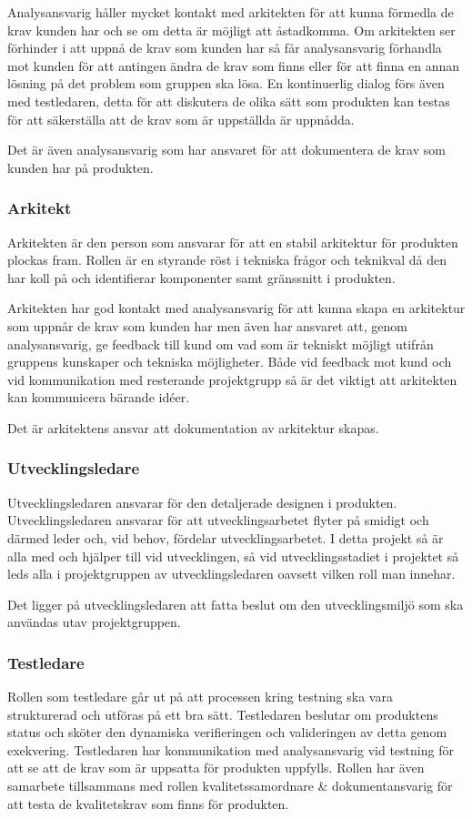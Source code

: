 \documentclass[a4paper,10pt]{article}
\begin{document}
Analysansvarig håller mycket kontakt med arkitekten för att kunna förmedla de krav kunden har och se om detta är möjligt att åstadkomma. Om arkitekten ser förhinder i att uppnå de krav som kunden har så får analysansvarig förhandla mot kunden för att antingen ändra de krav som finns eller för att finna en annan lösning på det problem som gruppen ska lösa.
En kontinuerlig dialog förs även med testledaren, detta för att diskutera de olika sätt som produkten kan testas för att säkerställa att de krav som är uppställda är uppnådda.

Det är även analysansvarig som har ansvaret för att dokumentera de krav som kunden har på produkten.
\subsubsection{Arkitekt}
Arkitekten är den person som ansvarar för att en stabil arkitektur för produkten plockas fram. Rollen är en styrande röst i tekniska frågor och teknikval då den har koll på och identifierar komponenter samt gränssnitt i produkten.

Arkitekten har god kontakt med analysansvarig för att kunna skapa en arkitektur som uppnår de krav som kunden har men även har ansvaret att, genom analysansvarig, ge feedback till kund om vad som är tekniskt möjligt utifrån gruppens kunskaper och tekniska möjligheter. Både vid feedback mot kund och vid kommunikation med resterande projektgrupp så är det viktigt att arkitekten kan kommunicera bärande idéer.

Det är arkitektens ansvar att dokumentation av arkitektur skapas.
\subsubsection{Utvecklingsledare}
Utvecklingsledaren ansvarar för den detaljerade designen i produkten. Utvecklingsledaren ansvarar för att utvecklingsarbetet flyter på smidigt och därmed leder och, vid behov, fördelar utvecklingsarbetet. I detta projekt så är alla med och hjälper till vid utvecklingen, så vid utvecklingsstadiet i projektet så leds alla i projektgruppen av utvecklingsledaren oavsett vilken roll man innehar.

Det ligger på utvecklingsledaren att fatta beslut om den utvecklingsmiljö som ska användas utav projektgruppen.
\subsubsection{Testledare}
Rollen som testledare går ut på att processen kring testning ska vara strukturerad och utföras på ett bra sätt. Testledaren beslutar om produktens status och sköter den dynamiska verifieringen och valideringen av detta genom exekvering. Testledaren har kommunikation med analysansvarig vid testning för att se att de krav som är uppsatta för produkten uppfylls. Rollen har även samarbete tillsammans med rollen kvalitetssamordnare \& dokumentansvarig för att testa de kvalitetskrav som finns för produkten.
\end{document}
